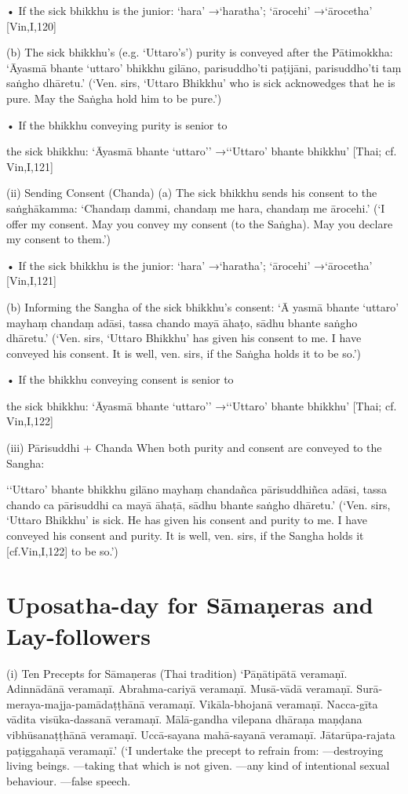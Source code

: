 • If the sick bhikkhu is the junior:
‘hara’ →‘haratha’; ‘ārocehi’ →‘ārocetha’
[Vin,I,120]

(b) The sick bhikkhu's (e.g. ‘Uttaro's’)
purity is conveyed after the Pātimokkha:
‘Āyasmā bhante ‘uttaro’ bhikkhu gilāno,
parisuddho'ti paṭijāni,
parisuddho'ti taṃ saṅgho dhāretu.’
(‘Ven. sirs, ‘Uttaro Bhikkhu’ who is sick acknowedges
that he is pure. May the Saṅgha hold him to be pure.’)

• If the bhikkhu conveying purity is senior to

the sick bhikkhu:
‘Āyasmā bhante ‘uttaro’’
→‘‘Uttaro’ bhante bhikkhu’
[Thai; cf. Vin,I,121]

(ii) Sending Consent (Chanda)
(a) The sick bhikkhu sends his consent to
the saṅghākamma:
‘Chandaṃ dammi,
chandaṃ me hara,
chandaṃ me ārocehi.’
(‘I offer my consent. May you convey my consent (to
the Saṅgha). May you declare my consent to them.’)

• If the sick bhikkhu is the junior:
‘hara’ →‘haratha’; ‘ārocehi’ →‘ārocetha’
[Vin,I,121]

(b) Informing the Sangha of the sick
bhikkhu's consent:
‘Ā yasmā bhante ‘uttaro’
mayhaṃ chandaṃ adāsi,
tassa chando mayā āhaṭo,
sādhu bhante saṅgho dhāretu.’
(‘Ven. sirs, ‘Uttaro Bhikkhu’ has given his consent to
me. I have conveyed his consent. It is well, ven. sirs, if
the Saṅgha holds it to be so.’)

• If the bhikkhu conveying consent is senior to

the sick bhikkhu:
‘Āyasmā bhante ‘uttaro’’
→‘‘Uttaro’ bhante bhikkhu’
[Thai; cf. Vin,I,122]

(iii) Pārisuddhi + Chanda
When both purity and consent are conveyed to
the Sangha:

‘‘Uttaro’ bhante bhikkhu gilāno mayhaṃ
chandañca pārisuddhiñca adāsi,
tassa chando ca pārisuddhi ca mayā āhaṭā,
sādhu bhante saṅgho dhāretu.’
(‘Ven. sirs, ‘Uttaro Bhikkhu’ is sick. He has given his
consent and purity to me. I have conveyed his consent
and purity. It is well, ven. sirs, if the Sangha holds it
[cf.Vin,I,122]
to be so.’)

\section{Uposatha-day for Sāmaṇeras and Lay-followers}

(i) Ten Precepts for Sāmaṇeras (Thai tradition)
‘Pāṇātipātā veramaṇī.
Adinnādānā veramaṇī.
Abrahma-cariyā veramaṇī.
Musā-vādā veramaṇī.
Surā-meraya-majja-pamādaṭṭhānā veramaṇī.
Vikāla-bhojanā veramaṇī.
Nacca-gīta vādita visūka-dassanā veramaṇī.
Mālā-gandha vilepana dhāraṇa maṇḍana
vibhūsanaṭṭhānā veramaṇī.
Uccā-sayana mahā-sayanā veramaṇī.
Jātarūpa-rajata paṭiggahaṇā veramaṇī.’
(‘I undertake the precept to refrain from:
—destroying living beings.
—taking that which is not given.
—any kind of intentional sexual behaviour.
—false speech.

